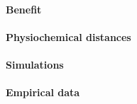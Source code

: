 \documentclass{article}
\begin{document}
\paragraph*{Benefit}

\paragraph*{Physiochemical distances}

\paragraph*{Simulations}

\paragraph*{Empirical data}

\end{document}
